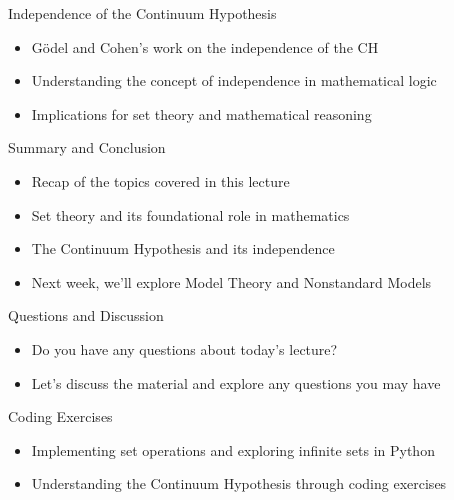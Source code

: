 \documentclass[presentation]{beamer}
\begin{document}
\begin{frame}[label={sec:org5b764ea}]{Independence of the Continuum Hypothesis}
\begin{itemize}
\item Gödel and Cohen's work on the independence of the CH
\item Understanding the concept of independence in mathematical logic
\item Implications for set theory and mathematical reasoning
\end{itemize}
\end{frame}

\begin{frame}[label={sec:org7662f44}]{Summary and Conclusion}
\begin{itemize}
\item Recap of the topics covered in this lecture
\item Set theory and its foundational role in mathematics
\item The Continuum Hypothesis and its independence
\item Next week, we'll explore Model Theory and Nonstandard Models
\end{itemize}
\end{frame}

\begin{frame}[label={sec:org664e513}]{Questions and Discussion}
\begin{itemize}
\item Do you have any questions about today's lecture?
\item Let's discuss the material and explore any questions you may have
\end{itemize}
\end{frame}

\begin{frame}[label={sec:orga6a2f46}]{Coding Exercises}
\begin{itemize}
\item Implementing set operations and exploring infinite sets in Python
\item Understanding the Continuum Hypothesis through coding exercises
\end{itemize}
\end{frame}
\end{document}
